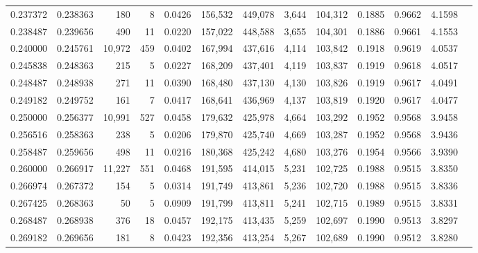 \begin{tabular}{rrrrrrrrrrrrr}
0.237372 & 0.238363 &    180 &     8 &                                     0.0426 & 156,532 & 449,078 &   3,644 & 104,312 & 0.1885 & 0.9662 & 4.1598 \\
0.238487 & 0.239656 &    490 &    11 &                                     0.0220 & 157,022 & 448,588 &   3,655 & 104,301 & 0.1886 & 0.9661 & 4.1553 \\
0.240000 & 0.245761 & 10,972 &   459 &                                     0.0402 & 167,994 & 437,616 &   4,114 & 103,842 & 0.1918 & 0.9619 & 4.0537 \\
0.245838 & 0.248363 &    215 &     5 &                                     0.0227 & 168,209 & 437,401 &   4,119 & 103,837 & 0.1919 & 0.9618 & 4.0517 \\
0.248487 & 0.248938 &    271 &    11 &                                     0.0390 & 168,480 & 437,130 &   4,130 & 103,826 & 0.1919 & 0.9617 & 4.0491 \\
0.249182 & 0.249752 &    161 &     7 &                                     0.0417 & 168,641 & 436,969 &   4,137 & 103,819 & 0.1920 & 0.9617 & 4.0477 \\
0.250000 & 0.256377 & 10,991 &   527 &                                     0.0458 & 179,632 & 425,978 &   4,664 & 103,292 & 0.1952 & 0.9568 & 3.9458 \\
0.256516 & 0.258363 &    238 &     5 &                                     0.0206 & 179,870 & 425,740 &   4,669 & 103,287 & 0.1952 & 0.9568 & 3.9436 \\
0.258487 & 0.259656 &    498 &    11 &                                     0.0216 & 180,368 & 425,242 &   4,680 & 103,276 & 0.1954 & 0.9566 & 3.9390 \\
0.260000 & 0.266917 & 11,227 &   551 &                                     0.0468 & 191,595 & 414,015 &   5,231 & 102,725 & 0.1988 & 0.9515 & 3.8350 \\
0.266974 & 0.267372 &    154 &     5 &                                     0.0314 & 191,749 & 413,861 &   5,236 & 102,720 & 0.1988 & 0.9515 & 3.8336 \\
0.267425 & 0.268363 &     50 &     5 &                                     0.0909 & 191,799 & 413,811 &   5,241 & 102,715 & 0.1989 & 0.9515 & 3.8331 \\
0.268487 & 0.268938 &    376 &    18 &                                     0.0457 & 192,175 & 413,435 &   5,259 & 102,697 & 0.1990 & 0.9513 & 3.8297 \\
0.269182 & 0.269656 &    181 &     8 &                                     0.0423 & 192,356 & 413,254 &   5,267 & 102,689 & 0.1990 & 0.9512 & 3.8280 \\

\end{tabular}
